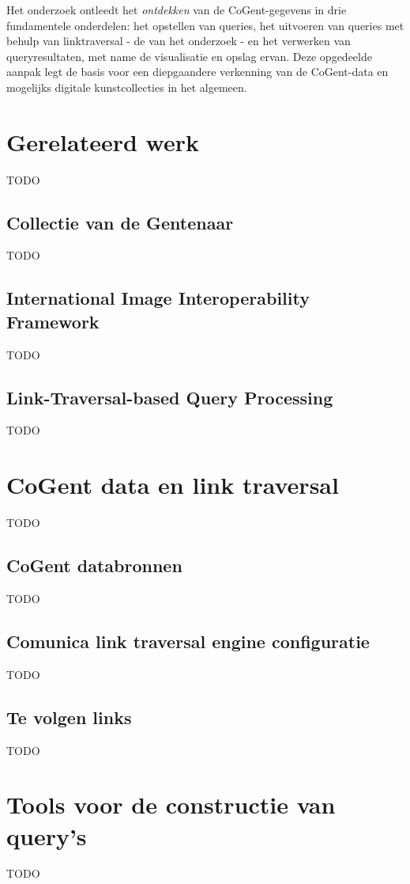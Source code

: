 \documentclass[conference]{IEEEtran}
\begin{document}
Het onderzoek ontleedt het \textit{ontdekken} van de CoGent-gegevens in drie fundamentele onderdelen: het opstellen van queries, het uitvoeren van queries met behulp van linktraversal - de van het onderzoek - en het verwerken van queryresultaten, met name de visualisatie en opslag ervan. Deze opgedeelde aanpak legt de basis voor een diepgaandere verkenning van de CoGent-data en mogelijks digitale kunstcollecties in het algemeen.

\section{Gerelateerd werk}
TODO

\subsection{Collectie van de Gentenaar}
TODO

\subsection{International Image Interoperability Framework}
TODO

\subsection{Link-Traversal-based Query Processing}
TODO

\section{CoGent data en link traversal}
TODO

\subsection{CoGent databronnen}
TODO

\subsection{Comunica link traversal engine configuratie}
TODO

\subsection{Te volgen links}
TODO

\section{Tools voor de constructie van query's}
TODO
\end{document}
